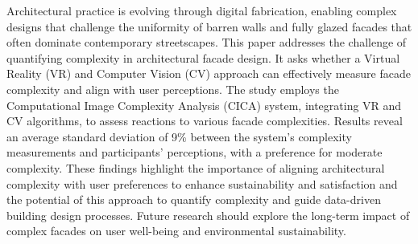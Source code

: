 



Architectural practice is evolving through digital fabrication, enabling complex designs that challenge the uniformity of barren walls and fully glazed facades that often dominate contemporary streetscapes.
This paper addresses the challenge of quantifying complexity in architectural facade design.
It asks whether a Virtual Reality (VR) and Computer Vision (CV) approach can effectively measure facade complexity and align with user perceptions.
The study employs the Computational Image Complexity Analysis (CICA) system, integrating VR and CV algorithms, to assess reactions to various facade complexities.
Results reveal an average standard deviation of 9\% between the system's complexity measurements and participants' perceptions, with a preference for moderate complexity.
These findings highlight the importance of aligning architectural complexity with user preferences to enhance sustainability and satisfaction and the potential of this approach to quantify complexity and guide data-driven building design processes.
Future research should explore the long-term impact of complex facades on user well-being and environmental sustainability.



